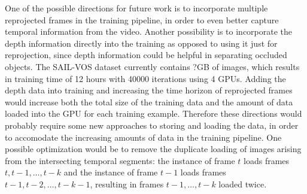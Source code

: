 One of the possible directions for future work is to incorporate multiple reprojected frames in the training pipeline, 
in order to even better capture temporal information from the video. 
Another possibility is to incorporate the depth information directly into the training as opposed to using it just for reprojection, 
since depth information could be helpful in separating occluded objects.
The SAIL-VOS dataset currently contains ?GB of images, which results in training time of 12 hours with 40000 iterations using 4 GPUs.
Adding the depth data into training and increasing the time horizon of reprojected frames would increase both the total size
of the training data and the amount of data loaded into the GPU for each training example.
Therefore these directions would probably require some new approaches to storing and loading the data, 
in order to accomodate the increasing amounts of data in the training pipeline. One possible optimization would be to 
remove the duplicate loading of images arising from the intersecting temporal segments: the instance of frame 
$t$ loads frames $t, t-1, \ldots, t-k$ and the instance of frame $t-1$ loads frames $t-1, t-2, \ldots, t-k-1$, resulting in frames
$t-1, \ldots, t-k$ loaded twice.

